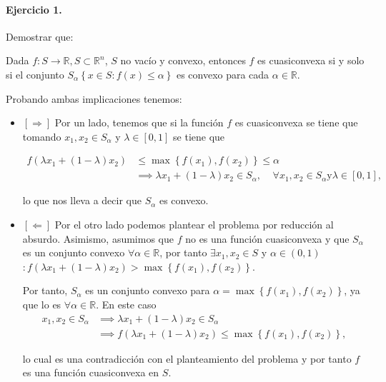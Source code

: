 \documentclass[12pt]{scrartcl}
\begin{document}
\vspace{1em}

\begin{boxF}
\paragraph*{Ejercicio 1.}Demostrar que:


Dada $f: S \to \mathbb{R}, S \subset \mathbb{R}^n$, $S$ no vacío y convexo, entonces $f$ es cuasiconvexa si y solo si el conjunto $S_\alpha \left\{ x \in S: f(x) \leq \alpha \right\} $ es convexo para cada $\alpha \in \mathbb{R}$.
\end{boxF}

Probando ambas implicaciones tenemos:

\begin{itemize}
    \item $\left[ \Longrightarrow \right]$ Por un lado, tenemos que si la función $f$ es cuasiconvexa se tiene que tomando $x_1, x_2 \in S_\alpha$ y $\lambda \in [0,1]$ se tiene que
    
        $$
        \begin{align*}
            f(\lambda x_1 + (1-\lambda) x_2) &\leq \max \left\{ f(x_1), f(x_2) \right\} \leq \alpha \\
            &\implies \lambda x_1 + (1-\lambda) x_2 \in S_\alpha, \;\;\;\; \forall  x_1, x_2 \in S_\alpha \text{y} \lambda \in [0,1],    
        \end{align*}
        $$

        lo que nos lleva a decir que $S_\alpha$ es convexo.

    \item $\left[ \Longleftarrow \right]$ Por el otro lado podemos plantear el problema por reducción al absurdo.
    Asimismo, asumimos que $f$ no es una función cuasiconvexa y que $S_\alpha$ es un conjunto convexo $\forall \alpha \in \mathbb{R}$, por tanto
    $\exists x_1, x_2 \in S$ y $\alpha \in (0,1)$ $: f(\lambda x_1 + (1-\lambda) x_2) > \max \left\{ f(x_1), f(x_2) \right\}$.
    
    Por tanto, $S_\alpha$ es un conjunto convexo para $\alpha=\max\left\{ f(x_1), f(x_2)\right\}$, ya que lo es $\forall \alpha \in \mathbb{R}$. En este caso
    $$
        \begin{align*}
            x_1, x_2 \in S_\alpha &\implies \lambda x_1 + (1-\lambda) x_2 \in S_\alpha \\
            &\implies f(\lambda x_1 + (1-\lambda) x_2) \leq \max \left\{ f(x_1), f(x_2)\right\},
        \end{align*}
        $$
    
        lo cual es una contradicción con el planteamiento del problema y por tanto $f$ es una función cuasiconvexa en $S$.
    
\end{itemize}
\end{document}
